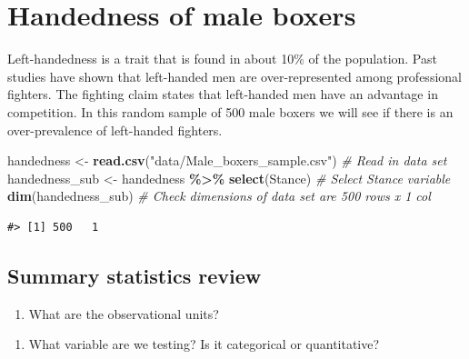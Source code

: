 \documentclass[
]{report}
\newenvironment{Shaded}{\begin{snugshade}}{\end{snugshade}}
\newcommand{\CommentTok}[1]{\textcolor[rgb]{0.56,0.35,0.01}{\textit{#1}}}
\newcommand{\KeywordTok}[1]{\textcolor[rgb]{0.13,0.29,0.53}{\textbf{#1}}}
\newcommand{\NormalTok}[1]{#1}
\newcommand{\OperatorTok}[1]{\textcolor[rgb]{0.81,0.36,0.00}{\textbf{#1}}}
\newcommand{\StringTok}[1]{\textcolor[rgb]{0.31,0.60,0.02}{#1}}
\providecommand{\tightlist}{%
  \setlength{\itemsep}{0pt}\setlength{\parskip}{0pt}}
\begin{document}
\hypertarget{handedness-of-male-boxers-1}{%
\section{Handedness of male boxers}\label{handedness-of-male-boxers-1}}

Left-handedness is a trait that is found in about 10\% of the population. Past studies have shown that left-handed men are over-represented among professional fighters. The fighting claim states that left-handed men have an advantage in competition. In this random sample of 500 male boxers we will see if there is an over-prevalence of left-handed fighters.

\begin{Shaded}
\begin{Highlighting}[]
\NormalTok{handedness \textless{}{-}}\StringTok{ }\KeywordTok{read.csv}\NormalTok{(}\StringTok{"data/Male\_boxers\_sample.csv"}\NormalTok{) }\CommentTok{\# Read in data set}
\NormalTok{handedness\_sub \textless{}{-}}\StringTok{ }\NormalTok{handedness }\OperatorTok{\%\textgreater{}\%}
\StringTok{  }\KeywordTok{select}\NormalTok{(Stance) }\CommentTok{\# Select Stance variable}
\KeywordTok{dim}\NormalTok{(handedness\_sub) }\CommentTok{\# Check dimensions of data set are 500 rows x 1 col}
\end{Highlighting}
\end{Shaded}

\begin{verbatim}
#> [1] 500   1
\end{verbatim}

\hypertarget{summary-statistics-review}{%
\subsection*{Summary statistics review}\label{summary-statistics-review}}

\begin{enumerate}
\def\labelenumi{\arabic{enumi}.}
\tightlist
\item
  What are the observational units?
\end{enumerate}

\vspace{0.5in}

\begin{enumerate}
\def\labelenumi{\arabic{enumi}.}
\setcounter{enumi}{1}
\tightlist
\item
  What variable are we testing? Is it categorical or quantitative?
\end{enumerate}
\end{document}
